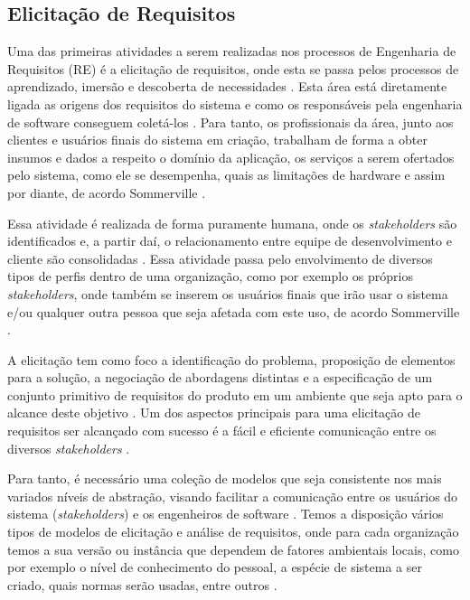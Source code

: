  \subsection{Elicitação de Requisitos}
 
 Uma das primeiras atividades a serem realizadas nos processos de Engenharia de Requisitos (RE) é a elicitação de requisitos, onde esta se passa pelos processos de aprendizado, imersão e descoberta de necessidades \cite{Hadar}. Esta área está diretamente ligada as origens dos requisitos do sistema e como os responsáveis pela engenharia de software conseguem coletá-los \cite{SWEBOK2014}. Para tanto, os profissionais da área, junto aos clientes e usuários finais do sistema em criação, trabalham de forma a obter insumos e dados a respeito o domínio da aplicação, os serviços a serem ofertados pelo sistema, como ele se desempenha, quais as limitações de hardware e assim por diante, de acordo Sommerville \cite{Sommerville07}.

Essa atividade é realizada de forma puramente humana, onde os \textit{stakeholders} são identificados e, a partir daí, o relacionamento entre equipe de desenvolvimento e cliente são consolidadas \cite{SWEBOK2014}. Essa atividade passa pelo envolvimento de diversos tipos de perfis dentro de uma organização, como por exemplo os próprios \textit{stakeholders}, onde também se inserem os usuários finais que irão usar o sistema e/ou qualquer outra pessoa que seja afetada com este uso, de acordo Sommerville \cite{Sommerville07}.

A elicitação tem como foco a identificação do problema, proposição de elementos para a solução, a negociação de abordagens distintas e a especificação de um conjunto primitivo de requisitos do produto em um ambiente que seja apto para o alcance deste objetivo \cite{pressman}. Um dos aspectos principais para uma elicitação de requisitos ser alcançado com sucesso é a fácil e eficiente comunicação entre os diversos \textit{stakeholders} \cite{SWEBOK2014}.

Para tanto, é necessário uma coleção de modelos que seja consistente nos mais variados níveis de abstração, visando facilitar a comunicação entre os usuários do sistema (\textit{stakeholders}) e os engenheiros de software \cite{SWEBOK2014}. Temos a disposição vários tipos de modelos de elicitação e análise de requisitos, onde para cada organização temos a sua versão ou instância que dependem de fatores ambientais locais, como por exemplo o nível de conhecimento do pessoal, a espécie de sistema a ser criado, quais normas serão usadas, entre outros \cite{Sommerville07}. 
 
